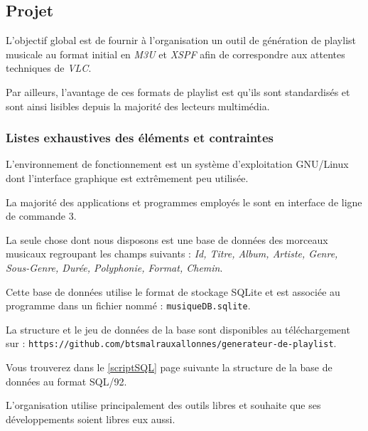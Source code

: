 \documentclass[a4paper,titlepage,oneside]{article}
\begin{document}
\subsection{Projet}
L’objectif global est de fournir à l’organisation un outil de génération de playlist musicale au format initial en \textit{M3U} et \textit{XSPF} afin de correspondre aux attentes techniques de \textit{VLC}.

Par ailleurs, l’avantage de ces formats de playlist est qu’ils sont standardisés et
sont ainsi lisibles depuis la majorité des lecteurs multimédia.

\subsubsection{Listes exhaustives des éléments et contraintes}
L’environnement de fonctionnement est un système d’exploitation GNU/Linux dont l’interface graphique est extrêmement peu utilisée.

La majorité des applications et programmes employés le sont en interface de ligne de commande 3.

La seule chose dont nous disposons est une base de données des morceaux musicaux regroupant les champs suivants : \textit{Id, Titre, Album, Artiste, Genre, Sous-Genre, Durée, Polyphonie, Format, Chemin}.

Cette base de données utilise le format de stockage SQLite et est associée au programme dans un fichier nommé : \texttt{musiqueDB.sqlite}.

La structure et le jeu de données de la base sont disponibles au téléchargement sur : \texttt{https://github.com/btsmalrauxallonnes/generateur-de-playlist}.

Vous trouverez dans le \vref{scriptSQL} page suivante la structure de la base de données au format SQL/92.

L’organisation utilise principalement des outils libres et souhaite que ses développements soient libres eux aussi.
\end{document}
